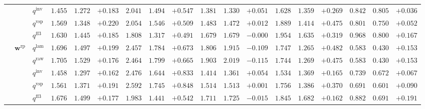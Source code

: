 \documentclass{article}
\begin{document}
\begin{table}[!htbp]
{\begin{tabular}{lll ccc ccc ccc ccc ccc}
 &  & $q^{\mathrm{inv}}$ & $1.455$ & $1.272$ & \cellcolor{posgreen!50}$+0.183$ & $2.041$ & $1.494$ & \cellcolor{posgreen!50}$+0.547$ & $1.381$ & $1.330$ & \cellcolor{posgreen!50}$+0.051$ & $1.628$ & $1.359$ & \cellcolor{posgreen!50}$+0.269$ & $0.842$ & $0.805$ & \cellcolor{posgreen!50}$+0.036$ \\
 &  & $q^{\mathrm{vsp}}$ & $1.569$ & $1.348$ & \cellcolor{posgreen!50}$+0.220$ & $2.054$ & $1.546$ & \cellcolor{posgreen!50}$+0.509$ & $1.483$ & $1.472$ & \cellcolor{posgreen!50}$+0.012$ & $1.889$ & $1.414$ & \cellcolor{posgreen!50}$+0.475$ & $0.801$ & $0.750$ & \cellcolor{posgreen!50}$+0.052$ \\
 &  & $q^{\mathrm{ff3}}$ & $1.630$ & $1.445$ & \cellcolor{posgreen!50}$+0.185$ & $1.808$ & $1.317$ & \cellcolor{posgreen!50}$+0.491$ & $1.679$ & $1.679$ & $-0.000$ & $1.954$ & $1.635$ & \cellcolor{posgreen!50}$+0.319$ & $0.968$ & $0.800$ & \cellcolor{posgreen!50}$+0.167$ \\
\cmidrule(lr){2-18}
 & $\mathbf{w}^{\mathrm{rp}}$ & $q^{\mathrm{lam}}$ & $1.696$ & $1.497$ & \cellcolor{posgreen!50}$+0.199$ & $2.457$ & $1.784$ & \cellcolor{posgreen!50}$+0.673$ & $1.806$ & $1.915$ & \cellcolor{negred!50}$-0.109$ & $1.747$ & $1.265$ & \cellcolor{posgreen!50}$+0.482$ & $0.583$ & $0.430$ & \cellcolor{posgreen!50}$+0.153$ \\
 &  & $q^{\mathrm{raw}}$ & $1.705$ & $1.529$ & \cellcolor{posgreen!50}$+0.176$ & $2.464$ & $1.799$ & \cellcolor{posgreen!50}$+0.665$ & $1.903$ & $2.019$ & \cellcolor{negred!50}$-0.115$ & $1.744$ & $1.269$ & \cellcolor{posgreen!50}$+0.475$ & $0.583$ & $0.430$ & \cellcolor{posgreen!50}$+0.153$ \\
 &  & $q^{\mathrm{inv}}$ & $1.458$ & $1.297$ & \cellcolor{posgreen!50}$+0.162$ & $2.476$ & $1.644$ & \cellcolor{posgreen!50}$+0.833$ & $1.414$ & $1.361$ & \cellcolor{posgreen!50}$+0.054$ & $1.534$ & $1.369$ & \cellcolor{posgreen!50}$+0.165$ & $0.739$ & $0.672$ & \cellcolor{posgreen!50}$+0.067$ \\
 &  & $q^{\mathrm{vsp}}$ & $1.561$ & $1.371$ & \cellcolor{posgreen!50}$+0.191$ & $2.592$ & $1.745$ & \cellcolor{posgreen!50}$+0.848$ & $1.514$ & $1.513$ & \cellcolor{posgreen!50}$+0.001$ & $1.756$ & $1.386$ & \cellcolor{posgreen!50}$+0.370$ & $0.691$ & $0.601$ & \cellcolor{posgreen!50}$+0.090$ \\
 &  & $q^{\mathrm{ff3}}$ & $1.676$ & $1.499$ & \cellcolor{posgreen!50}$+0.177$ & $1.983$ & $1.441$ & \cellcolor{posgreen!50}$+0.542$ & $1.711$ & $1.725$ & \cellcolor{negred!50}$-0.015$ & $1.845$ & $1.682$ & \cellcolor{posgreen!50}$+0.162$ & $0.882$ & $0.691$ & \cellcolor{posgreen!50}$+0.191$ \\
\bottomrule
\end{tabular}}
\end{table}
\end{document}
